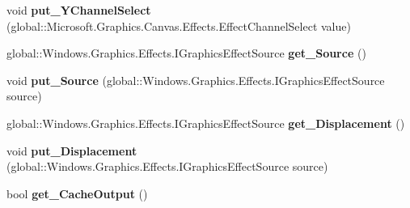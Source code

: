 \begin{DoxyCompactItemize}
\mbox{\label{class_microsoft_1_1_graphics_1_1_canvas_1_1_effects_1_1_displacement_map_effect_a16f640070ff4f567c8c7c530557b8c10}} 
void {\bfseries put\+\_\+\+Y\+Channel\+Select} (global\+::\+Microsoft.\+Graphics.\+Canvas.\+Effects.\+Effect\+Channel\+Select value)
\item 
\mbox{\label{class_microsoft_1_1_graphics_1_1_canvas_1_1_effects_1_1_displacement_map_effect_af69fbee08f58e40ff331229945a58a92}} 
global\+::\+Windows.\+Graphics.\+Effects.\+I\+Graphics\+Effect\+Source {\bfseries get\+\_\+\+Source} ()
\item 
\mbox{\label{class_microsoft_1_1_graphics_1_1_canvas_1_1_effects_1_1_displacement_map_effect_a111bf667fceee07085a750745d777c13}} 
void {\bfseries put\+\_\+\+Source} (global\+::\+Windows.\+Graphics.\+Effects.\+I\+Graphics\+Effect\+Source source)
\item 
\mbox{\label{class_microsoft_1_1_graphics_1_1_canvas_1_1_effects_1_1_displacement_map_effect_aaf5364680c98ed0f56450c34b38dd81a}} 
global\+::\+Windows.\+Graphics.\+Effects.\+I\+Graphics\+Effect\+Source {\bfseries get\+\_\+\+Displacement} ()
\item 
\mbox{\label{class_microsoft_1_1_graphics_1_1_canvas_1_1_effects_1_1_displacement_map_effect_ae673a7b19adf4c74fc290965e8c469d3}} 
void {\bfseries put\+\_\+\+Displacement} (global\+::\+Windows.\+Graphics.\+Effects.\+I\+Graphics\+Effect\+Source source)
\item 
\mbox{\label{class_microsoft_1_1_graphics_1_1_canvas_1_1_effects_1_1_displacement_map_effect_a98dc9dff78bcf54a0714684a37fac496}} 
bool {\bfseries get\+\_\+\+Cache\+Output} ()
\item 
\mbox{\label{class_microsoft_1_1_graphics_1_1_canvas_1_1_effects_1_1_displacement_map_effect_a6ea6152dfdb5861dd9ddb378972ab881}} 

\end{DoxyCompactItemize}
